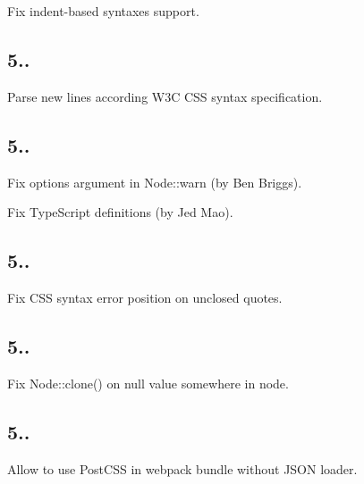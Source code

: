 \begin{DoxyItemize}
\item Fix indent-\/based syntaxes support.
\end{DoxyItemize}

\subsection*{5..}


\begin{DoxyItemize}
\item Parse new lines according W3C C\+SS syntax specification.
\end{DoxyItemize}

\subsection*{5..}


\begin{DoxyItemize}
\item Fix options argument in {\ttfamily Node\+::warn} (by Ben Briggs).
\item Fix Type\+Script definitions (by Jed Mao).
\end{DoxyItemize}

\subsection*{5..}


\begin{DoxyItemize}
\item Fix C\+SS syntax error position on unclosed quotes.
\end{DoxyItemize}

\subsection*{5..}


\begin{DoxyItemize}
\item Fix {\ttfamily Node\+::clone()} on {\ttfamily null} value somewhere in node.
\end{DoxyItemize}

\subsection*{5..}


\begin{DoxyItemize}
\item Allow to use Post\+C\+SS in webpack bundle without J\+S\+ON loader.
\end{DoxyItemize}

